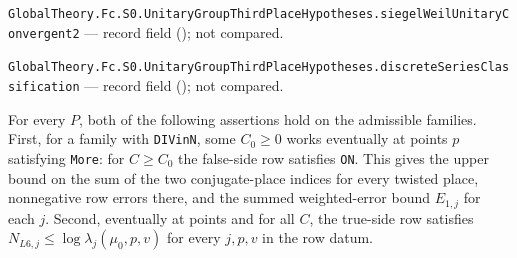 \noindent\nolinkurl{GlobalTheory.Fc.S0.UnitaryGroupThirdPlaceHypotheses.siegelWeilUnitaryConvergent2} --- record field (); not compared.\par
\noindent\nolinkurl{GlobalTheory.Fc.S0.UnitaryGroupThirdPlaceHypotheses.discreteSeriesClassification} --- record field (); not compared.\par

\begin{formalstatement}\label{sub:T05}

For every $P$, both of the following assertions hold on the admissible
families. First, for a family with \nolinkurl{DIVinN}, some $C_0\ge0$ works
eventually at points $p$ satisfying \nolinkurl{More}: for $C\ge C_0$ the
false-side row satisfies \nolinkurl{ON}. This gives the upper bound on the
sum of the two conjugate-place indices for every twisted place, nonnegative
row errors there, and the summed weighted-error bound $E_{1,j}$ for each $j$.
Second, eventually at points and for all $C$, the true-side row satisfies
$N_{L6,j}\le\log\lambda_j(\mu_0,p,v)$ for every $j,p,v$ in the row datum.

\end{formalstatement}
